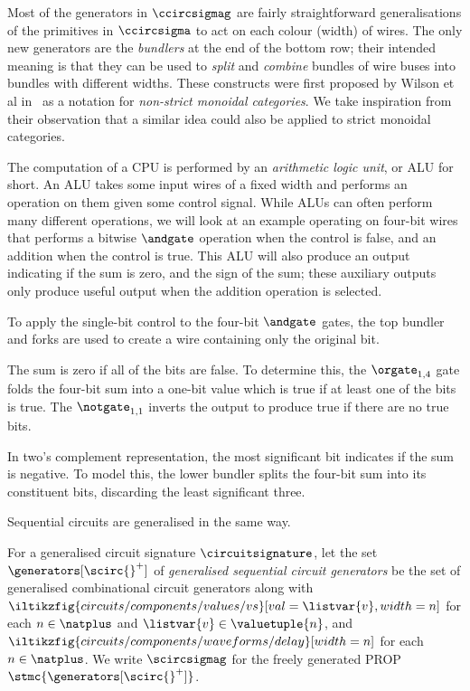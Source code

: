 \documentclass{lmcs}
\begin{document}
Most of the generators  in \(\ccircsigmag\) are fairly straightforward
generalisations of the primitives in \(\ccircsigma\) to act on each
colour (width) of wires.
The only new generators are the \emph{bundlers} at the end of the bottom row;
their intended meaning is that they can be used to \emph{split} and
\emph{combine} bundles of wire buses into bundles with different widths.
These constructs were first proposed by Wilson et al in~\cite{wilson2023string}
as a notation for \emph{non-strict monoidal categories}.
We take inspiration from their observation that a similar idea could also be
applied to strict monoidal categories.

\begin{exa}[ALU]
    The computation of a CPU is performed by an \emph{arithmetic logic unit},
    or ALU for short.
    An ALU takes some input wires of a fixed width and performs an operation
    on them given some control signal.
    While ALUs can often perform many different operations, we will look at an
    example operating on four-bit wires that performs a bitwise \(\andgate\)
    operation when the control is false, and an addition when the control is
    true.
    This ALU will also produce an output indicating if the sum is zero, and
    the sign of the sum; these auxiliary outputs only produce useful output when
    the addition operation is selected.

    \begin{center}
    \end{center}

    To apply the single-bit control to the four-bit \(\andgate\) gates, the
    top bundler and forks are used to create a wire containing only the
    original bit.

    The sum is zero if all of the bits are false.
    To determine this, the \(\orgate_{1,4}\) gate folds the four-bit sum into
    a one-bit value which is true if at least one of the bits is true.
    The \(\notgate_{1,1}\) inverts the output to produce true if there are no
    true bits.

    In two's complement representation, the most significant bit indicates if
    the sum is negative.
    To model this, the lower bundler splits the four-bit sum into its
    constituent bits, discarding the least significant three.
\end{exa}

Sequential circuits are generalised in the same way.

\begin{defi}
    For a generalised circuit signature \(\circuitsignature\), let the set
    \(\generators[\scirc{}^+]\) of
    \emph{generalised sequential circuit generators} be the set of
    generalised combinational circuit generators along with
    \(
    \iltikzfig{circuits/components/values/vs}[val=\listvar{v},width=n]
    \) for each \(n \in \natplus\) and \(\listvar{v} \in \valuetuple{n}\), and
    \(
    \iltikzfig{circuits/components/waveforms/delay}[width=n]
    \) for each \(n \in \natplus\).
    We write \(\scircsigmag\) for the freely generated PROP
    \(\stmc{\generators[\scirc{}^+]}\).
\end{defi}
\end{document}
